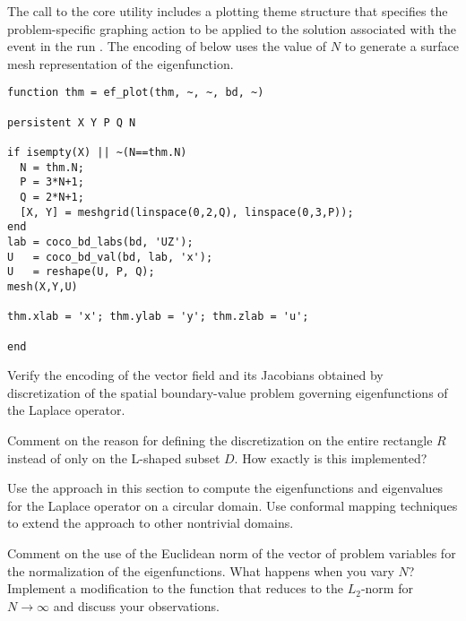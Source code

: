 The call to the  core utility includes a plotting theme structure that specifies the problem-specific graphing action to be applied to the solution associated with the  event in the run . The encoding of  below uses the value of $N$ to generate a surface mesh representation of the eigenfunction.
\begin{lstlisting}[language=coco-highlight]
function thm = ef_plot(thm, ~, ~, bd, ~)

persistent X Y P Q N

if isempty(X) || ~(N==thm.N)
  N = thm.N;
  P = 3*N+1;
  Q = 2*N+1;
  [X, Y] = meshgrid(linspace(0,2,Q), linspace(0,3,P));
end
lab = coco_bd_labs(bd, 'UZ');
U   = coco_bd_val(bd, lab, 'x');
U   = reshape(U, P, Q);
mesh(X,Y,U)

thm.xlab = 'x'; thm.ylab = 'y'; thm.zlab = 'u';

end
\end{lstlisting}
\medskip

\begin{exercises}

\item Verify the encoding of the vector field and its Jacobians obtained by discretization of the spatial boundary-value problem governing eigenfunctions of the Laplace operator.

\item Comment on the reason for defining the discretization on the entire rectangle $R$ instead of only on the L-shaped subset $D$. How exactly is this implemented?

\item Use the approach in this section to compute the eigenfunctions and eigenvalues for the Laplace operator on a circular domain. Use conformal mapping techniques to extend the approach to other nontrivial domains.

\item Comment on the use of the Euclidean norm of the vector of problem variables for the normalization of the eigenfunctions. What happens when you vary $N$? Implement a modification to the function  that reduces to the $L_2$-norm for $N\to\infty$ and discuss your observations.

\end{exercises}


